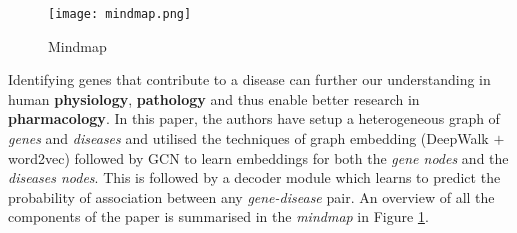 \begin{sloppypar*}
    
    \begin{figure}
        \centering
        \texttt{[image: mindmap.png]}
        \caption{Mindmap}
        \label{fig:mindmap}
    \end{figure}

    Identifying genes that contribute to a disease can further our understanding
    in human \textbf{physiology}, \textbf{pathology} and thus enable better
    research in \textbf{pharmacology}. In this paper, the authors have setup a
    heterogeneous graph of \textit{genes} and \textit{diseases} and utilised the
    techniques of graph embedding (DeepWalk $+$ word2vec) followed by GCN \cite{kipfGCN}
    to learn embeddings for both the \textit{gene nodes} and the \textit{diseases
    nodes}. This is followed by a decoder module which learns to predict the
    probability of association between any \textit{gene-disease} pair. An overview
    of all the components of the paper is summarised in the \textit{mindmap} in
    Figure \ref{fig:mindmap}.
\end{sloppypar*}